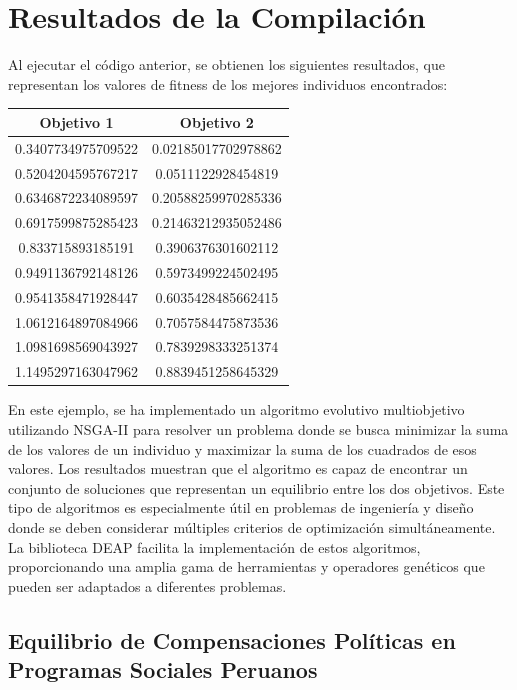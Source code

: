 \documentclass[12pt]{article}
\begin{document}
\section*{Resultados de la Compilación}
Al ejecutar el código anterior, se obtienen los siguientes resultados, que representan los valores de fitness de los mejores individuos encontrados:

\begin{center}
\begin{tabular}{|c|c|}
    \hline
    \textbf{Objetivo 1} & \textbf{Objetivo 2} \\
    \hline
    0.3407734975709522 & 0.02185017702978862 \\
    0.5204204595767217 & 0.0511122928454819 \\
    0.6346872234089597 & 0.20588259970285336 \\
    0.6917599875285423 & 0.21463212935052486 \\
    0.833715893185191 & 0.3906376301602112 \\
    0.9491136792148126 & 0.5973499224502495 \\
    0.9541358471928447 & 0.6035428485662415 \\
    1.0612164897084966 & 0.7057584475873536 \\
    1.0981698569043927 & 0.7839298333251374 \\
    1.1495297163047962 & 0.8839451258645329 \\
    \hline
\end{tabular}
\end{center}

En este ejemplo, se ha implementado un algoritmo evolutivo multiobjetivo utilizando NSGA-II para resolver un problema donde se busca minimizar la suma de los valores de un individuo y maximizar la suma de los cuadrados de esos valores. Los resultados muestran que el algoritmo es capaz de encontrar un conjunto de soluciones que representan un equilibrio entre los dos objetivos. Este tipo de algoritmos es especialmente útil en problemas de ingeniería y diseño donde se deben considerar múltiples criterios de optimización simultáneamente. La biblioteca DEAP facilita la implementación de estos algoritmos, proporcionando una amplia gama de herramientas y operadores genéticos que pueden ser adaptados a diferentes problemas.



\subsection{Equilibrio de Compensaciones Políticas en Programas Sociales Peruanos}
\end{document}
